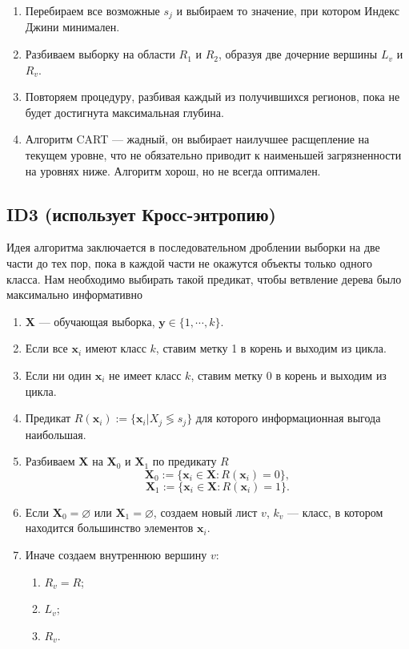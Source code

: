 \documentclass{article}
\theoremstyle{definition}
\theoremstyle{theorem}
\theoremstyle{remark}
\theoremstyle{theorem}
\theoremstyle{example}
\theoremstyle{theorem}
\theoremstyle{theorem}
\theoremstyle{theorem}
\theoremstyle{theorem}
\begin{document}
\begin{enumerate}
	\item Перебираем все возможные $s_j$ и выбираем то значение, при котором Индекс Джини минимален.
	\item Разбиваем выборку на области $R_1$ и $R_2$, образуя две дочерние вершины $L_v$ и $R_v$.
	\item Повторяем процедуру, разбивая каждый из получившихся регионов, пока не будет достигнута максимальная глубина.
	\item Алгоритм CART --- жадный, он выбирает наилучшее расщепление на текущем уровне, что не обязательно приводит к наименьшей загрязненности на уровнях ниже. Алгоритм хорош, но не всегда оптимален.
\end{enumerate}

\subsection{ID3 (использует Кросс-энтропию)}

Идея алгоритма заключается в последовательном дроблении выборки на две части
до тех пор, пока в каждой части не окажутся объекты только одного класса. Нам необходимо выбирать такой предикат, чтобы ветвление дерева было максимально информативно

\begin{enumerate}
	\item $\textbf{X}$ --- обучающая выборка, $\textbf{y} \in \{1, \cdots, k\}$.
	\item Если все $\textbf{x}_i$ имеют класс $k$, ставим метку 1 в корень и выходим из цикла.
	\item Если ни один $\textbf{x}_i$ не имеет класс $k$, ставим метку 0 в корень и выходим из цикла.
	\item Предикат $R(\textbf{x}_i):=\{ \textbf{x}_i | X_j \lessgtr s_j \}$ для которого информационная выгода наибольшая.
	\item Разбиваем $\textbf{X}$ на $\textbf{X}_0$ и $\textbf{X}_1$ по предикату $R$
	$$\textbf{X}_0:=\{ \textbf{x}_i \in \textbf{X}:R(\textbf{x}_i) = 0 \},$$
	$$\textbf{X}_1:=\{ \textbf{x}_i \in \textbf{X}:R(\textbf{x}_i) = 1 \}.$$
	\item Если $\textbf{X}_0 = \varnothing$ или $\textbf{X}_1 = \varnothing$, создаем новый лист $v$, $k_v$ --- класс, в котором находится большинство элементов $\textbf{x}_i.$
	\item Иначе создаем внутреннюю вершину $v$:
	\begin{enumerate}
		\item $R_v = R$;
		\item $L_v$;
		\item $R_v$.
	\end{enumerate}
\end{enumerate}
\end{document}

